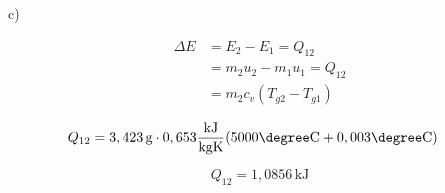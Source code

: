 c)

\begin{align*}
\Delta E &= E_2 - E_1 = Q_{12} \\
&= m_2 u_2 - m_1 u_1 = Q_{12} \\
&= m_2 c_v (T_{g2} - T_{g1})
\end{align*}

\begin{align*}
Q_{12} &= 3,423 \, \text{g} \cdot 0,653 \frac{\text{kJ}}{\text{kgK}} (5000 \degree \text{C} + 0,003 \degree \text{C})
\end{align*}

\[
Q_{12} = 1,0856 \, \text{kJ}
\]